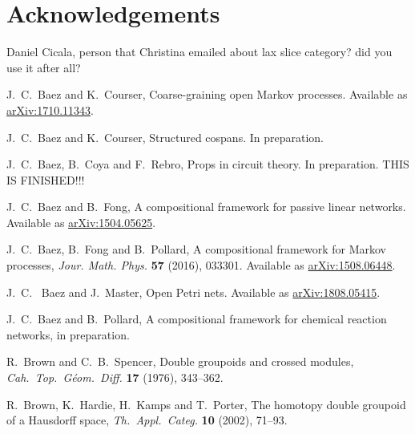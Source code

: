 \documentclass{amsart}
\begin{document}
\section{Acknowledgements}
Daniel Cicala, person that Christina emailed about lax slice category? {\chris did you use it after all?}
\begin{thebibliography}{100}

 J.\ C.\ Baez and K.\ Courser, Coarse-graining open Markov processes. Available as \href{https://arxiv.org/abs/1710.11343}{arXiv:1710.11343}.

 J.\ C.\ Baez and K.\ Courser, Structured cospans. In preparation.

 J.\ C.\ Baez, B.\ Coya and F.\ Rebro, Props in circuit theory. In preparation. THIS IS FINISHED!!!

 J.\ C.\ Baez and B.\ Fong, A compositional framework for passive linear networks. Available as \href{http://arxiv.org/abs/1504.05625}{arXiv:1504.05625}.

 J.\ C.\ Baez, B.\ Fong and B.\ Pollard, A compositional framework for Markov processes, \textsl{Jour. Math. Phys.} \textbf{57} (2016), 033301. Available as \href{http://arxiv.org/abs/1508.06448}{arXiv:1508.06448}.

 J.\ C. \ Baez and J.\ Master, Open Petri nets. Available as \href{https://arxiv.org/abs/1808.05415}{arXiv:1808.05415}.

 J.\ C.\ Baez and B.\ Pollard, A compositional framework for chemical reaction networks, in preparation.

 R.\ Brown and C.\ B.\ Spencer, Double groupoids and crossed modules, 
\textsl{Cah.\ Top.\ G\'eom.\ Diff.} \textbf{17} (1976), 343--362.

 R.\ Brown, K.\ Hardie, H.\ Kamps and T.\ Porter, The homotopy double groupoid of a Hausdorff space, \textsl{Th.\ Appl.\ Categ.} \textbf{10} (2002), 71--93.





\end{thebibliography}
\end{document}
